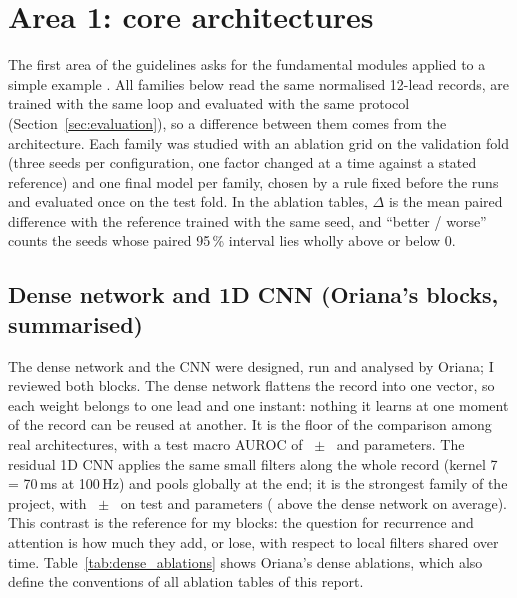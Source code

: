 \section{Area 1: core architectures}\label{sec:architectures}

The first area of the guidelines asks for the fundamental modules applied to a simple example
\cite{course_message_2011}. All families below read the same normalised 12-lead records, are trained
with the same loop and evaluated with the same protocol (Section~\ref{sec:evaluation}), so a difference
between them comes from the architecture. Each family was studied with an ablation grid on the
validation fold (three seeds per configuration, one factor changed at a time against a stated
reference) and one final model per family, chosen by a rule fixed before the runs and evaluated once on
the test fold. In the ablation tables, $\Delta$ is the mean paired difference with the reference trained
with the same seed, and ``better / worse'' counts the seeds whose paired 95\,\% interval lies wholly
above or below 0.

\subsection{Dense network and 1D CNN (Oriana's blocks, summarised)}\label{sec:dense-cnn}

The dense network and the CNN were designed, run and analysed by Oriana; I reviewed both blocks. The
dense network flattens the record into one vector, so each weight belongs to one lead and one instant:
nothing it learns at one moment of the record can be reused at another. It is the floor of the
comparison among real architectures, with a test macro AUROC of
\denseFinalTestMacroAurocMean{}~$\pm$~\denseFinalTestMacroAurocSd{} and
\denseFinalNParams{} parameters. The residual 1D CNN applies the same small filters along the whole
record (kernel 7 = 70\,ms at 100\,Hz) and pools globally at the end; it is the strongest family of the
project, with \cnnFinalTestMacroAurocMean{}~$\pm$~\cnnFinalTestMacroAurocSd{} on test and
\cnnFinalNParams{} parameters (\cnnDiffDenseMean{} above the dense network on average). This contrast is
the reference for my blocks: the question for recurrence and attention is how much they add, or lose,
with respect to local filters shared over time.
Table~\ref{tab:dense_ablations} shows Oriana's dense ablations, which also define the conventions of all
ablation tables of this report.

